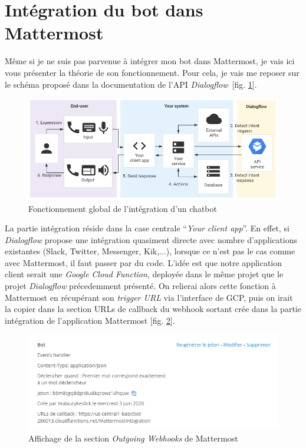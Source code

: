 \documentclass[stage2a]{tnreport} %
\begin{document}
\newpage

\section{Intégration du bot dans Mattermost}

Même si je ne suis pas parvenue à intégrer mon bot dans Mattermost, je vais ici vous présenter la théorie de son fonctionnement. Pour cela, je vais me reposer sur le schéma proposé dans la documentation de l'API \emph{Dialogflow}~\cite{APIdialogflow}[fig. \ref{API}].\\

\begin{figure}[h!]
    \centering
    \includegraphics[width=\textwidth]{figures/API_schema.PNG}
    \caption{Fonctionnement global de l'intégration d'un chatbot~\cite{APIdialogflow}}
    \label{API}
\end{figure}

La partie intégration réside dans la case centrale ``\emph{Your client app}''. En effet, si \emph{Dialogflow} propose une intégration quasiment directe avec nombre d'applications existantes (Slack, Twitter, Messenger, Kik,...), lorsque ce n'est pas le cas comme avec Mattermost, il faut passer par du code. L'idée est que notre application client serait une \emph{Google Cloud Function}, deployée dans le même projet que le projet \emph{Dialogflow} précedemment présenté. On relierai alors cette fonction à Mattermost en récupérant son \emph{trigger URL} via l'interface de GCP, puis on irait la copier dans la section URLs de callback du webhook sortant crée dans la partie intégration de l'application Mattermost [fig. \ref{wh}]. \\

\begin{figure}[h!]
    \centering
    \includegraphics[width=\textwidth]{figures/MattermostWebhook.PNG}
    \caption{Affichage de la section \emph{Outgoing Webhooks} de Mattermost}
    \label{wh}
\end{figure}
\end{document}
